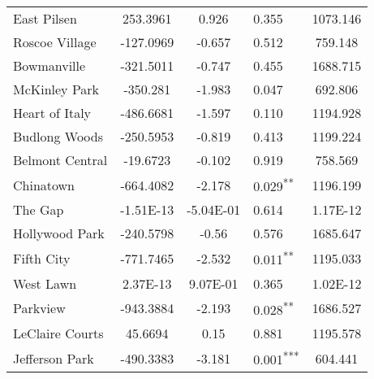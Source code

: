 \documentclass[12pt]{report}
\begin{document}
\begin{longtable}{l S[table-format=6.4] S[table-format=3.4] l S[table-format=4.4]}
	East Pilsen                  & 253.3961             & 0.926            & 0.355                      & 1073.146                          \\
	Roscoe Village               & -127.0969            & -0.657           & 0.512                      & 759.148                           \\
	Bowmanville                  & -321.5011            & -0.747           & 0.455                      & 1688.715                          \\
	McKinley Park                & -350.281             & -1.983           & 0.047                      & 692.806                           \\
	Heart of Italy               & -486.6681            & -1.597           & 0.110                      & 1194.928                          \\
	Budlong Woods                & -250.5953            & -0.819           & 0.413                      & 1199.224                          \\
	Belmont Central              & -19.6723             & -0.102           & 0.919                      & 758.569                           \\
	Chinatown                    & -664.4082            & -2.178           & 0.029\textsuperscript{**}  & 1196.199                          \\
	The Gap                      & -1.51E-13            & -5.04E-01        & 0.614                      & 1.17E-12                          \\
	Hollywood Park               & -240.5798            & -0.56            & 0.576                      & 1685.647                          \\
	Fifth City                   & -771.7465            & -2.532           & 0.011\textsuperscript{**}  & 1195.033                          \\
	West Lawn                    & 2.37E-13             & 9.07E-01         & 0.365                      & 1.02E-12                          \\
	Parkview                     & -943.3884            & -2.193           & 0.028\textsuperscript{**}  & 1686.527                          \\
	LeClaire Courts              & 45.6694              & 0.15             & 0.881                      & 1195.578                          \\
	Jefferson Park               & -490.3383            & -3.181           & 0.001\textsuperscript{***} & 604.441                           \\

\end{longtable}
\end{document}
